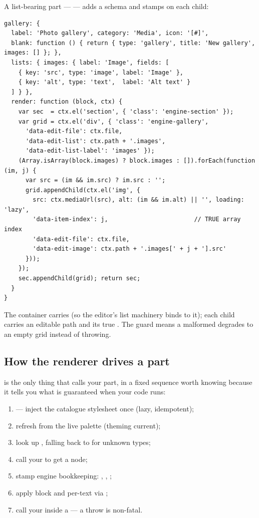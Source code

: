 \documentclass[11pt]{article}
\begin{document}
A list-bearing part ---  --- adds a  schema and
stamps  on each child:

\begin{lstlisting}
gallery: {
  label: 'Photo gallery', category: 'Media', icon: '[#]',
  blank: function () { return { type: 'gallery', title: 'New gallery', images: [] }; },
  lists: { images: { label: 'Image', fields: [
    { key: 'src', type: 'image', label: 'Image' },
    { key: 'alt', type: 'text',  label: 'Alt text' }
  ] } },
  render: function (block, ctx) {
    var sec  = ctx.el('section', { 'class': 'engine-section' });
    var grid = ctx.el('div', { 'class': 'engine-gallery',
      'data-edit-file': ctx.file,
      'data-edit-list': ctx.path + '.images',
      'data-edit-list-label': 'images' });
    (Array.isArray(block.images) ? block.images : []).forEach(function (im, j) {
      var src = (im && im.src) ? im.src : '';
      grid.appendChild(ctx.el('img', {
        src: ctx.mediaUrl(src), alt: (im && im.alt) || '', loading: 'lazy',
        'data-item-index': j,                        // TRUE array index
        'data-edit-file': ctx.file,
        'data-edit-image': ctx.path + '.images[' + j + '].src'
      }));
    });
    sec.appendChild(grid); return sec;
  }
}
\end{lstlisting}

The container carries  (so the editor's list machinery binds
to it); each child carries an editable path and its true .
The  guard means a malformed  degrades to an
empty grid instead of throwing.

\subsection{How the renderer drives a part}

 is the only thing that calls your part, in a fixed
sequence worth knowing because it tells you what is guaranteed when your code
runs:

\begin{enumerate}[leftmargin=1.6em, itemsep=1pt]
\item {} --- inject the catalogue stylesheet once (lazy, idempotent);
\item refresh  from the live  palette (theming current);
\item look up , falling back to  for unknown types;
\item call your  to get a node;
\item stamp engine bookkeeping: , , ;
\item apply block  and per-text  via ;
\item call your  inside a  --- a throw is non-fatal.
\end{enumerate}
\end{document}
